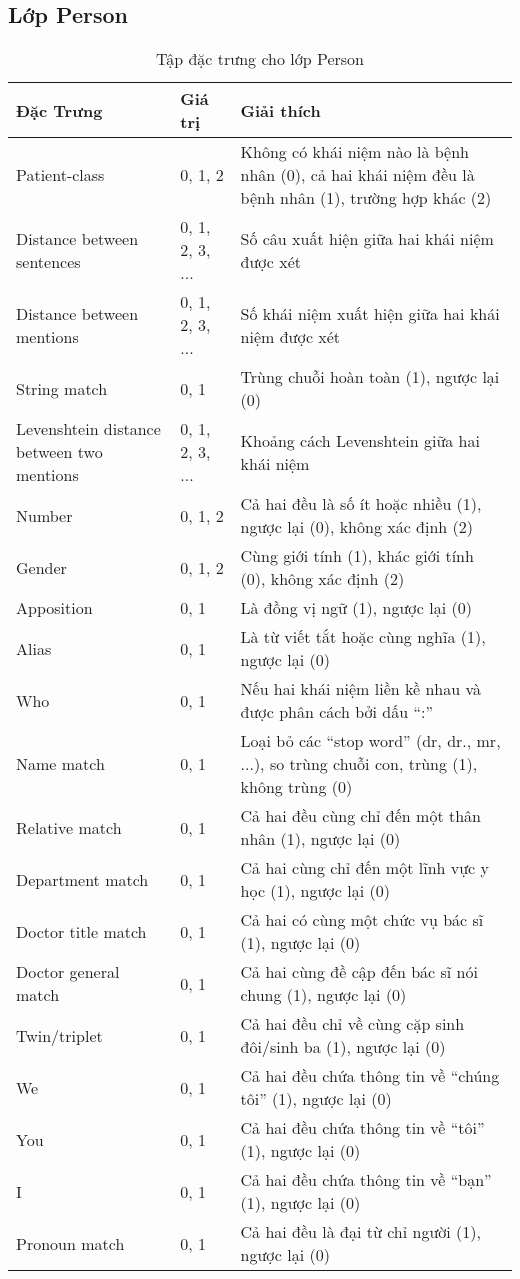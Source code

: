 \subsection*{Lớp Person}
\begin{table}[t!]
\centering{}
\caption{Tập đặc trưng cho lớp Person \label{tab:PersonFeatures}}
\footnotesize\sffamily

\begin{tabularx}{\textwidth}{@{}P{\raggedright}{0.3}lL@{}}
\toprule 
\textbf{Đặc Trưng} & \textbf{Giá trị} & \textbf{Giải thích}\\
\midrule
Patient-class & 0, 1, 2 & Không có khái niệm nào là bệnh nhân (0), cả hai khái niệm đều là bệnh nhân (1), trường hợp khác (2)\\
Distance between sentences & 0, 1, 2, 3, ... & Số câu xuất hiện giữa hai khái niệm được xét\\
Distance between mentions & 0, 1, 2, 3, ... & Số khái niệm xuất hiện giữa hai khái niệm được xét\\
String match & 0, 1 & Trùng chuỗi hoàn toàn (1), ngược lại (0)\\
Levenshtein distance between two mentions & 0, 1, 2, 3, ... & Khoảng cách Levenshtein giữa hai khái niệm\\
Number & 0, 1, 2 & Cả hai đều là số ít hoặc nhiều (1), ngược lại (0), không xác định (2)\\
Gender & 0, 1, 2 & Cùng giới tính (1), khác giới tính (0), không xác định (2)\\
Apposition & 0, 1 & Là đồng vị ngữ (1), ngược lại (0)\\
Alias & 0, 1 & Là từ viết tắt hoặc cùng nghĩa (1), ngược lại (0)\\
Who & 0, 1 & Nếu hai khái niệm liền kề nhau và được phân cách bởi dấu ``:''\\
Name match & 0, 1 & Loại bỏ các	``stop word'' (dr, dr., mr, ...), so trùng chuỗi con, trùng (1), không trùng (0)\\
Relative match & 0, 1 & Cả hai đều cùng chỉ đến một thân nhân (1), ngược lại (0)\\
Department match & 0, 1 & Cả hai cùng chỉ đến một lĩnh vực y học (1), ngược lại (0)\\
Doctor title match & 0, 1 & Cả hai có cùng một chức vụ bác sĩ (1), ngược lại (0)\\
Doctor general match & 0, 1 & Cả hai cùng đề cập đến bác sĩ nói chung (1), ngược lại (0)\\
Twin/triplet & 0, 1 & Cả hai đều chỉ về cùng cặp sinh đôi/sinh ba (1), ngược lại (0)\\
We & 0, 1 & Cả hai đều chứa thông tin về ``chúng tôi'' (1), ngược lại (0)\\
You & 0, 1 & Cả hai đều chứa thông tin về ``tôi'' (1), ngược lại (0)\\
I & 0, 1 & Cả hai đều chứa thông tin về ``bạn'' (1), ngược lại (0)\\
Pronoun match & 0, 1 & Cả hai đều là đại từ chỉ người (1), ngược lại (0)\\
\bottomrule
\end{tabularx}
\end{table}

